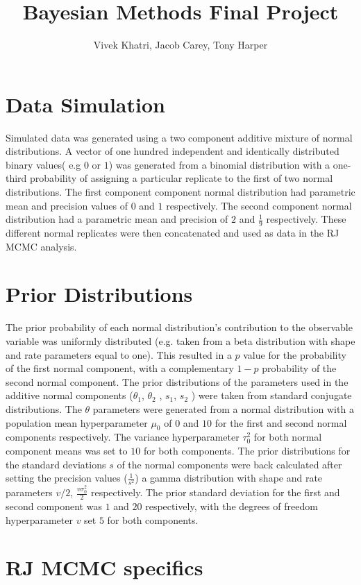 \documentclass[12pt]{article}
\title{Bayesian Methods Final Project}
\author{Vivek Khatri, Jacob Carey, Tony Harper}
\date{}
\begin{document}
\section*{Data Simulation}
Simulated data was generated using a two component additive mixture of normal distributions.  A vector of one hundred independent and identically distributed binary values( e.g $0$ or $1$) was generated from a binomial distribution with a one-third probability of assigning a particular replicate to the first of two normal distributions. The first component component normal distribution had parametric mean and precision values of $0$ and $1$ respectively. The second component normal distribution had a parametric mean and precision of $2$ and $\frac{1}{9}$ respectively. These different normal replicates were then concatenated and used as data in the RJ MCMC analysis.

\section*{Prior Distributions}
The prior probability of each normal distribution’s contribution to the observable variable was uniformly distributed (e.g. taken from a beta distribution with shape and rate parameters equal to one). This resulted in a $p$ value for the probability of the first normal component, with a complementary $1-p$ probability of the second normal component.
The prior distributions of the parameters used in the additive normal components ($\theta_1$, $\theta_2$ , $s_1$, $s_2$ ) were taken from standard conjugate distributions. The $\theta$ parameters were generated from a normal distribution with a population mean hyperparameter $\mu_0$ of $0$ and $10$ for the first and second normal components respectively. The variance hyperparameter $\tau_0^2$ for both normal component means was set to $10$ for both components.
	The prior distributions for the standard deviations $s$ of the normal components were back calculated after setting the precision values ($\frac{1}{s^2}$)  a gamma distribution with shape and rate parameters $v/2$, $\frac{v\sigma_0^2}{2}$ respectively. The prior standard deviation for the first and second component  was $1$ and $20$ respectively, with the degrees of freedom hyperparameter $v$ set $5$ for both components. 

\section*{RJ MCMC specifics}
\end{document}
